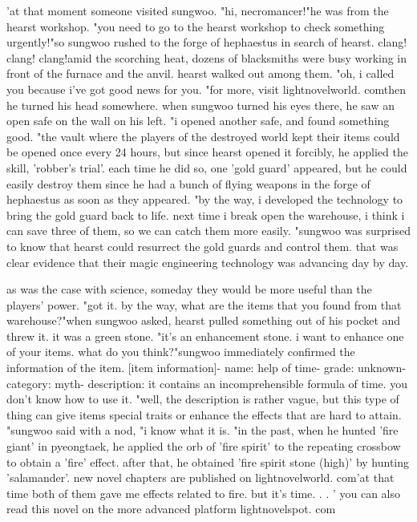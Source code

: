 'at that moment someone visited sungwoo.
"hi, necromancer!"he was from the hearst workshop.
"you need to go to the hearst workshop to check something urgently!"so sungwoo rushed to the forge of hephaestus in search of hearst.
clang! clang! clang!amid the scorching heat, dozens of blacksmiths were busy working in front of the furnace and the anvil.
hearst walked out among them.
"oh, i called you because i've got good news for you.
"for more, visit lightnovelworld.
comthen he turned his head somewhere.
 when sungwoo turned his eyes there, he saw an open safe on the wall on his left.
"i opened another safe, and found something good.
"the vault where the players of the destroyed world kept their items could be opened once every 24 hours, but since hearst opened it forcibly, he applied the skill, 'robber's trial'.
each time he did so, one 'gold guard' appeared, but he could easily destroy them since he had a bunch of flying weapons in the forge of hephaestus as soon as they appeared.
"by the way, i developed the technology to bring the gold guard back to life.
 next time i break open the warehouse, i think i can save three of them, so we can catch them more easily.
"sungwoo was surprised to know that hearst could resurrect the gold guards and control them.
 that was clear evidence that their magic engineering technology was advancing day by day.


as was the case with science, someday they would be more useful than the players' power.
"got it.
 by the way, what are the items that you found from that warehouse?"when sungwoo asked, hearst pulled something out of his pocket and threw it.
it was a green stone.
"it's an enhancement stone.
 i want to enhance one of your items.
 what do you think?"sungwoo immediately confirmed the information of the item.
[item information]- name: help of time- grade: unknown- category: myth- description: it contains an incomprehensible formula of time.
 you don't know how to use it.
"well, the description is rather vague, but this type of thing can give items special traits or enhance the effects that are hard to attain.
"sungwoo said with a nod, "i know what it is.
"in the past, when he hunted 'fire giant' in pyeongtaek, he applied the orb of 'fire spirit' to the repeating crossbow to obtain a 'fire' effect.
 after that, he obtained 'fire spirit stone (high)' by hunting 'salamander'.
new novel chapters are published on lightnovelworld.
com'at that time both of them gave me effects related to fire.
 but it's time.
.
.
' you can also read this novel on the more advanced platform lightnovelspot.
com

 